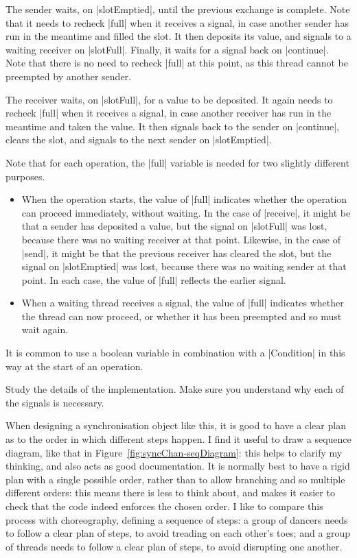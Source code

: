 The sender waits, on |slotEmptied|, until the previous exchange is complete.
Note that it needs to recheck |full| when it receives a signal, in case
another sender has run in the meantime and filled the slot.  It then deposits
its value, and signals to a waiting receiver on |slotFull|.  Finally, it waits
for a signal back on |continue|.  Note that there is no need to recheck |full|
at this point, as this thread cannot be preempted by another sender.

The receiver waits, on |slotFull|, for a value to be deposited.  It again
needs to recheck |full| when it receives a signal, in case another receiver
has run in the meantime and taken the value.  It then signals back to the
sender on |continue|, clears the slot, and signals to the next sender on
|slotEmptied|. 

Note that for each operation, the |full| variable is needed for two slightly
different purposes.
%
\begin{itemize}
\item When the operation starts, the value of |full| indicates whether the
  operation can proceed immediately, without waiting.  In the case of
  |receive|, it might be that a sender has deposited a value, but the signal
  on |slotFull| was lost, because there was no waiting receiver at that
  point.  Likewise, in the case of |send|, it might be that the previous
  receiver has cleared the slot, but the signal on |slotEmptied| was lost,
  because there was no waiting sender at that point.  In each case, the value
  of |full| reflects the earlier signal. 

\item When a waiting thread receives a signal, the value of |full| indicates
  whether the thread can now proceed, or whether it has been preempted and so
  must wait again.
\end{itemize}
%
It is common to use a boolean variable in combination with a |Condition| in
this way at the start of an operation.

\begin{instruction}
Study the details of the implementation.  Make sure you understand why each of
the signals is necessary.
\end{instruction}

When designing a synchronisation object like this, it is good to have a clear
plan as to the order in which different steps happen.  I find it useful to
draw a sequence diagram, like that in Figure~\ref{fig:syncChan-seqDiagram}:
this helps to clarify my thinking, and also acts as good documentation.  It is
normally best to have a rigid plan with a single possible order, rather than
to allow branching and so multiple different orders: this means there is less
to think about, and makes it easier to check that the code indeed enforces the
chosen order.
%
I like to compare this process with choreography, defining a sequence of
steps: a group of dancers needs to follow a clear plan of steps, to avoid
treading on each other's toes; and a group of threads needs to follow a clear
plan of steps, to avoid disrupting one another.


